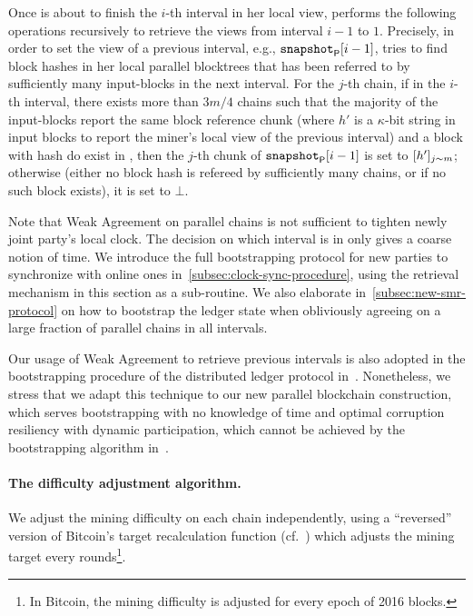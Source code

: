 Once \newParty is about to finish the $i$-th interval in her local view, \newParty performs the following operations recursively to retrieve the views from interval $i - 1$ to $1$.
%
Precisely, in order to set the view of a previous interval, e.g., $\mathtt{snapshot}_\mathsf{P}[i - 1]$, \newParty tries to find block hashes in her local parallel blocktrees that has been referred to by sufficiently many input-blocks in the next interval.
%
For the $j$-th chain, if in the $i$-th interval, there exists more than $3m / 4$ chains such that the majority of the input-blocks report the same block reference chunk  (where $h'$ is a $\kappa$-bit string in input blocks to report the miner's local view of the previous interval) and a block with hash  do exist in \parallelTreesLocal, then the $j$-th chunk of $\mathtt{snapshot}_\mathsf{P}[i - 1]$ is set to $[h']_{j\sim m}$; otherwise (either no block hash is refereed by sufficiently many chains, or if no such block exists), it is set to $\bot$.

Note that Weak Agreement on parallel chains is not sufficient to tighten newly joint party's local clock.
%
The decision on which interval \newParty is in only gives a coarse notion of time.
%
We introduce the full bootstrapping protocol for new parties to synchronize with online ones in~\cref{subsec:clock-sync-procedure}, using the retrieval mechanism in this section as a sub-routine.
%
We also elaborate in~\cref{subsec:new-smr-protocol} on how to bootstrap the ledger state when obliviously agreeing on a large fraction of parallel chains in all intervals.

\begin{remark} \label{remark:weak-agreement}
      Our usage of Weak Agreement to retrieve previous intervals is also adopted in the bootstrapping procedure of the distributed ledger protocol in~\cite{EC:GarKiaShe24}.
      Nonetheless, we stress that we adapt this technique to our new parallel blockchain construction, which serves bootstrapping with no knowledge of time and optimal corruption resiliency with dynamic participation, which cannot be achieved by the bootstrapping algorithm in~\cite{EC:GarKiaShe24}.
\end{remark}

\paragraph{The difficulty adjustment algorithm.}
%
We adjust the mining difficulty on each chain independently, using a ``reversed'' version of Bitcoin's target recalculation function (cf.~\cite{TCC:GarKiaShe22}) which adjusts the mining target every \epochLen rounds\footnote{In Bitcoin, the mining difficulty is adjusted for every epoch of 2016 blocks.}.

